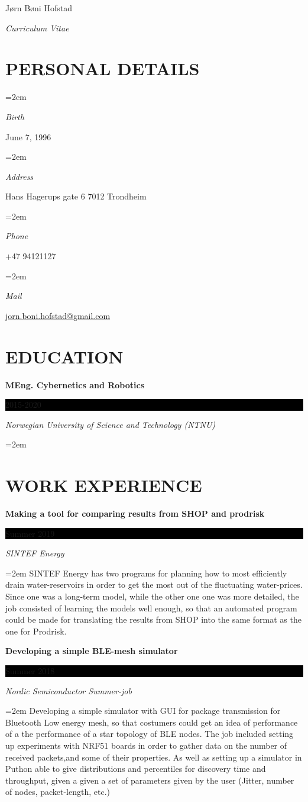 \documentclass[paper=a4,fontsize=11pt,norsk]{scrartcl} %
\newlength{\spacebox}
\newcommand{\sepspace}{\vspace*{1em}}		%
\newcommand{\MyName}[1]{ %
		\Huge \usefont{OT1}{phv}{b}{n} \hfill #1
		\par \normalsize \normalfont}
\newcommand{\MySlogan}[1]{ %
		\large \usefont{OT1}{phv}{m}{n}\hfill \textit{#1}
		\par \normalsize \normalfont}
\newcommand{\NewPart}[1]{\section*{\uppercase{#1}}}
\newcommand{\PersonalEntry}[2]{
		\noindent\hangindent=2em\hangafter=0 %
		\parbox{\spacebox}{        %
		\textit{#1}}		       %
		\hspace{1.5em} #2 \par}    %
\newcommand{\EducationEntry}[4]{
		\noindent \textbf{#1} \hfill      %
		\colorbox{Black}{%
			\parbox{6em}{%
			\hfill\color{White}#2}} \par  %
		\noindent \textit{#3} \par        %
		\noindent\hangindent=2em\hangafter=0 \small #4 %
		\normalsize \par}
\begin{document}

\MyName{Jørn Bøni Hofstad}
\MySlogan{Curriculum Vitae}

\sepspace

\NewPart{Personal details}{}

\PersonalEntry{Birth}{June 7, 1996}
\PersonalEntry{Address}{Hans Hagerups gate 6 7012 Trondheim}
\PersonalEntry{Phone}{+47 94121127}
\PersonalEntry{Mail}{\url{jorn.boni.hofstad@gmail.com}}

\NewPart{Education}{}

\EducationEntry{MEng. Cybernetics and Robotics}{2015-2020}{Norwegian University of Science and Technology (NTNU)}{}
\sepspace

\NewPart{Work experience}{}
\EducationEntry{Making a tool for comparing results from SHOP and prodrisk}{Summer 2019}{SINTEF Energy}{
SINTEF Energy has two programs for planning how to most efficiently drain water-reservoirs in order to get the most out of the fluctuating water-prices. Since one was a long-term model, while the other one one was more detailed, the job consisted of learning the models well enough, so that an automated program could be made for translating the results from SHOP into the same format as the one for Prodrisk.  
}

\EducationEntry{Developing a simple BLE-mesh simulator}{Summer 2018}{Nordic Semiconductor Summer-job}{
Developing a simple simulator with GUI for package transmission for Bluetooth Low energy mesh, so that costumers could get an idea of performance of a the performance of a star topology of BLE nodes. The job included setting up experiments with NRF51 boards in order to gather data on the number of received packets,and some of their properties. As well as setting up a simulator in Puthon able to give distributions and percentiles for discovery time and throughput, given a given a set of parameters given by the user (Jitter, number of nodes, packet-length, etc.) 

}
\end{document}

